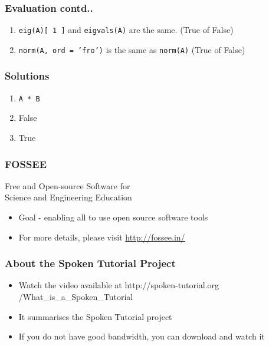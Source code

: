 \documentclass[17pt,compress]{beamer}
\newcounter{saveenumi}
\newcommand{\conti}{\setcounter{enumi}{\value{saveenumi}}}
\begin{document}
\begin{frame}
\frametitle{Evaluation contd..}
\label{sec-12.2}

\begin{enumerate}
\conti
\item \texttt{eig(A)[ 1 ]} and \texttt{eigvals(A)} are the same. (True of False)\pause
\item \texttt{norm(A, ord = 'fro')} is the same as \texttt{norm(A)} (True of False)
\end{enumerate}
\end{frame}
\begin{frame}
\frametitle{Solutions}
\label{sec-13}


\begin{enumerate}
\item \texttt{A * B}\pause
\vspace{12pt}
\item False\pause
\vspace{12pt}
\item True
\end{enumerate}
\end{frame}
\begin{frame}
\frametitle{FOSSEE}
{\color{blue}Free and Open-source Software for \\Science and Engineering Education} \\
\begin{itemize}
\item Goal - enabling all to use open source software tools
\item For more details, please visit {\color{blue}\url{http://fossee.in/}}
\end{itemize}
\end{frame}
\begin{frame}
\frametitle{About the Spoken Tutorial Project}
\begin{itemize}
\item Watch the video available at {\color{blue}http://spoken-tutorial.org /What\_is\_a\_Spoken\_Tutorial}
\item It summarises the Spoken Tutorial project \pause
\item If you do not have good bandwidth, you can download and watch it
\end{itemize}
\end{frame}
\end{document}
